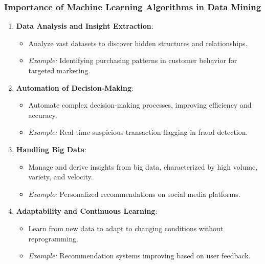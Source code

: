 \documentclass[aspectratio=169]{beamer}
\begin{document}
\begin{frame}[fragile]
    \frametitle{Importance of Machine Learning Algorithms in Data Mining}
    \begin{enumerate}
        \item \textbf{Data Analysis and Insight Extraction}:
            \begin{itemize}
                \item Analyze vast datasets to discover hidden structures and relationships.
                \item \textit{Example:} Identifying purchasing patterns in customer behavior for targeted marketing.
            \end{itemize}
        
        \item \textbf{Automation of Decision-Making}:
            \begin{itemize}
                \item Automate complex decision-making processes, improving efficiency and accuracy.
                \item \textit{Example:} Real-time suspicious transaction flagging in fraud detection.
            \end{itemize}
        
        \item \textbf{Handling Big Data}:
            \begin{itemize}
                \item Manage and derive insights from big data, characterized by high volume, variety, and velocity.
                \item \textit{Example:} Personalized recommendations on social media platforms.
            \end{itemize}
        
        \item \textbf{Adaptability and Continuous Learning}:
            \begin{itemize}
                \item Learn from new data to adapt to changing conditions without reprogramming.
                \item \textit{Example:} Recommendation systems improving based on user feedback.
            \end{itemize}
    \end{enumerate}
\end{frame}
\end{document}
